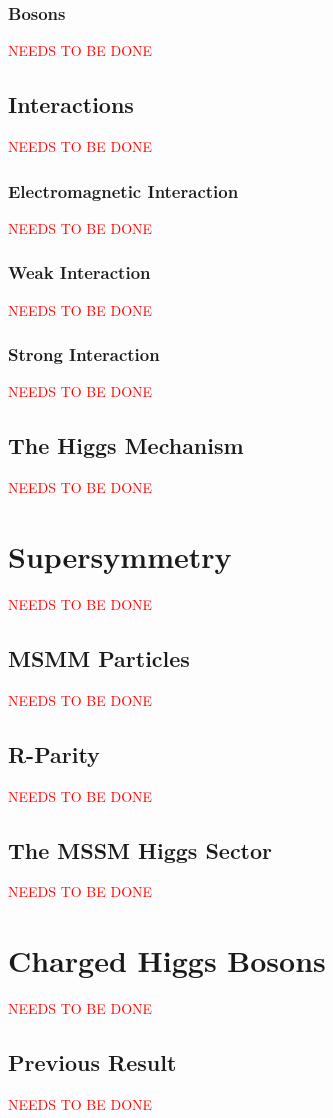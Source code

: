 		\subsubsection{Bosons}
			\textcolor{red}{NEEDS TO BE DONE}

	\subsection{Interactions}
		\textcolor{red}{NEEDS TO BE DONE}

		\subsubsection{Electromagnetic Interaction}

			\textcolor{red}{NEEDS TO BE DONE}

		\subsubsection{Weak Interaction}
			\textcolor{red}{NEEDS TO BE DONE}

		\subsubsection{Strong Interaction}
			\textcolor{red}{NEEDS TO BE DONE}

	\subsection{The Higgs Mechanism}
		\textcolor{red}{NEEDS TO BE DONE}

\section{Supersymmetry}
	\textcolor{red}{NEEDS TO BE DONE}

	\subsection{MSMM Particles}
		\textcolor{red}{NEEDS TO BE DONE}

	\subsection{R-Parity}
		\textcolor{red}{NEEDS TO BE DONE}

	\subsection{The MSSM Higgs Sector}
		\textcolor{red}{NEEDS TO BE DONE}

\section{Charged Higgs Bosons}
	\textcolor{red}{NEEDS TO BE DONE}

	\subsection{Previous Result}
		\textcolor{red}{NEEDS TO BE DONE}